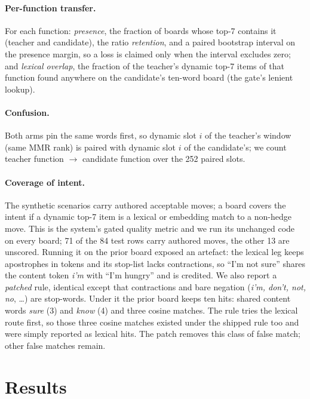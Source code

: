 \paragraph{Per-function transfer.}
For each function: \emph{presence}, the fraction of boards whose top-7
contains it (teacher and candidate), the ratio \emph{retention}, and a
paired bootstrap interval on the presence margin, so a loss is claimed
only when the interval excludes zero; and \emph{lexical overlap}, the
fraction of the teacher's dynamic top-7 items of that function found
anywhere on the candidate's ten-word board (the gate's lenient lookup).

\paragraph{Confusion.}
Both arms pin the same words first, so dynamic slot $i$ of the teacher's
window (same MMR rank) is paired with dynamic slot $i$ of the candidate's;
we count teacher function $\to$ candidate function over the 252 paired
slots.

\paragraph{Coverage of intent.}
The synthetic scenarios carry authored acceptable moves; a board covers
the intent if a dynamic top-7 item is a lexical or embedding match to a
non-hedge move. This is the system's gated quality metric and we run its
unchanged code on every board; 71 of the 84 test rows carry authored moves,
the other 13 are unscored. Running it on the prior board exposed an
artefact: the lexical leg keeps apostrophes in tokens and its stop-list
lacks contractions, so ``I'm not sure'' shares the content token
\emph{i'm} with ``I'm hungry'' and is credited. We also report a
\emph{patched} rule, identical except that contractions and bare negation
(\emph{i'm, don't, not, no}, \ldots) are stop-words. Under it the prior
board keeps ten hits: shared content words \emph{sure} (3) and \emph{know}
(4) and three cosine matches. The rule tries the lexical route first, so
those three cosine matches existed under the shipped rule too and were
simply reported as lexical hits. The patch removes this class of false
match; other false matches remain.

\section{Results}
\label{sec:results}

